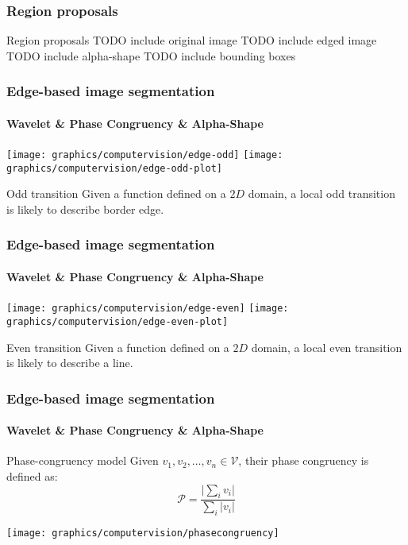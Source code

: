 \subsubsection{Region proposals}
\begin{frame}{Region proposals}
    TODO include original image
    TODO include edged image
    TODO include alpha-shape
    TODO include bounding boxes
\end{frame}

\begin{frame}
        \frametitle{Edge-based image segmentation}
        \framesubtitle{Wavelet \& Phase Congruency \& Alpha-Shape}
        \texttt{[image: graphics/computervision/edge-odd]}
        \texttt{[image: graphics/computervision/edge-odd-plot]}
        \begin{exampleblock}{Odd transition}
            Given a function defined on a $2D$ domain, a local odd transition is likely to describe border edge.
        \end{exampleblock}
    \end{frame}

    \begin{frame}
        \frametitle{Edge-based image segmentation}
        \framesubtitle{Wavelet \& Phase Congruency \& Alpha-Shape}
        \texttt{[image: graphics/computervision/edge-even]}
        \texttt{[image: graphics/computervision/edge-even-plot]}
        \begin{exampleblock}{Even transition}
            Given a function defined on a $2D$ domain, a local even transition is likely to describe a line.
        \end{exampleblock}
    \end{frame}
    
    \begin{frame}
        \frametitle{Edge-based image segmentation}
        \framesubtitle{Wavelet \& Phase Congruency \& Alpha-Shape}
            \begin{block}{Phase-congruency model}
                Given $v_1, v_2, \ldots, v_n \in \mathcal{V}$, their phase congruency is defined as:
                \begin{equation}
                    \mathcal{P} = \frac{\lvert \sum_{i} v_i \rvert}{\sum_{i} \lvert v_i \rvert}
                \end{equation}
            \end{block}
            \centering
            \texttt{[image: graphics/computervision/phasecongruency]}
    \end{frame}

